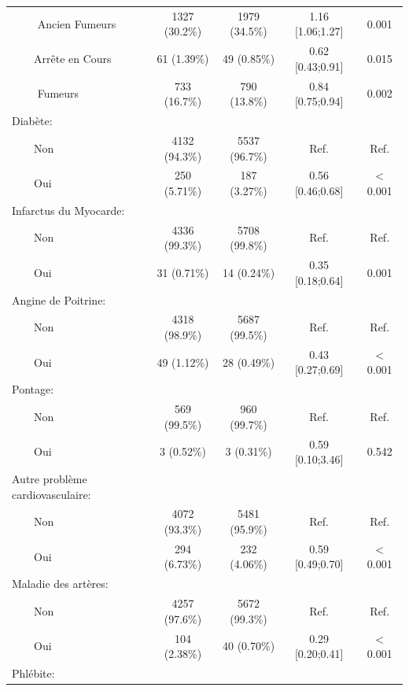 \documentclass{book}
\begin{document}
\begin{longtable}{lcccc}
$\qquad$ Ancien Fumeurs & 1327 (30.2\%) & 1979 (34.5\%) & 1.16 [1.06;1.27] &  0.001 \\ 
$\qquad$Arrête en Cours &  61 (1.39\%)  &  49 (0.85\%)  & 0.62 [0.43;0.91] &  0.015 \\ 
$\qquad$ Fumeurs & 733 (16.7\%)  & 790 (13.8\%)  & 0.84 [0.75;0.94] &  0.002 \\ 
Diabète: &              &              &                  &        \\ 
$\qquad$Non & 4132 (94.3\%) & 5537 (96.7\%) &       Ref.       &  Ref.  \\ 
$\qquad$Oui & 250 (5.71\%)  & 187 (3.27\%)  & 0.56 [0.46;0.68] & $<$0.001 \\ 
Infarctus du Myocarde: &              &              &                  &        \\ 
$\qquad$Non & 4336 (99.3\%) & 5708 (99.8\%) &       Ref.       &  Ref.  \\ 
$\qquad$Oui &  31 (0.71\%)  &  14 (0.24\%)  & 0.35 [0.18;0.64] &  0.001 \\ 
Angine de Poitrine: &              &              &                  &        \\ 
$\qquad$Non & 4318 (98.9\%) & 5687 (99.5\%) &       Ref.       &  Ref.  \\ 
$\qquad$Oui &  49 (1.12\%)  &  28 (0.49\%)  & 0.43 [0.27;0.69] & $<$0.001 \\ 
Pontage: &              &              &                  &        \\ 
$\qquad$Non & 569 (99.5\%)  & 960 (99.7\%)  &       Ref.       &  Ref.  \\ 
$\qquad$Oui &  3 (0.52\%)   &  3 (0.31\%)   & 0.59 [0.10;3.46] &  0.542 \\ 
Autre problème cardiovasculaire: &              &              &                  &        \\ 
$\qquad$Non & 4072 (93.3\%) & 5481 (95.9\%) &       Ref.       &  Ref.  \\ 
$\qquad$Oui & 294 (6.73\%)  & 232 (4.06\%)  & 0.59 [0.49;0.70] & $<$0.001 \\ 
Maladie des artères: &              &              &                  &        \\ 
$\qquad$Non & 4257 (97.6\%) & 5672 (99.3\%) &       Ref.       &  Ref.  \\ 
$\qquad$Oui & 104 (2.38\%)  &  40 (0.70\%)  & 0.29 [0.20;0.41] & $<$0.001 \\ 
Phlébite: &              &              &                  &        \\ 

\end{longtable}
\end{document}
